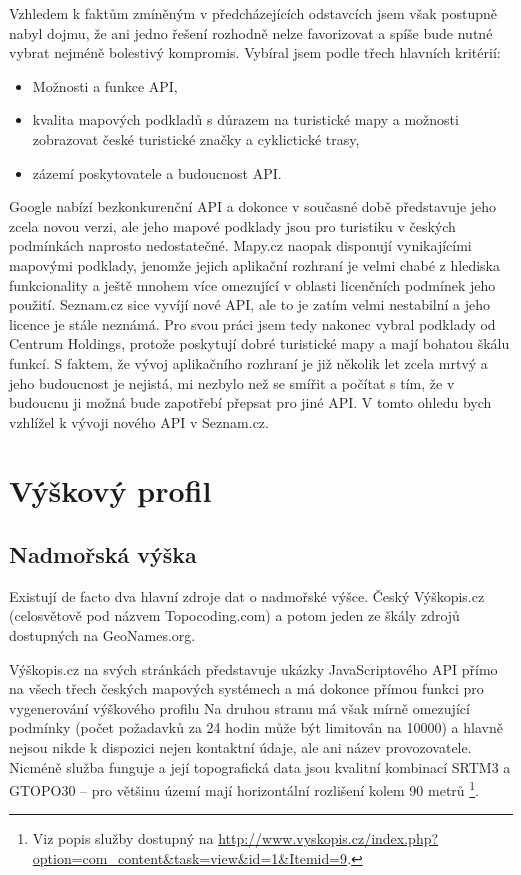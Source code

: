 Vzhledem k faktům zmíněným v předcházejících odstavcích jsem však
postupně nabyl dojmu, že ani jedno řešení rozhodně nelze favorizovat a
spíše bude nutné vybrat nej\-méně bolestivý kompromis. Vybíral jsem
podle třech hlavních kritérií:
\begin{itemize}
	\item Možnosti a funkce API,
	\item kvalita mapových podkladů s důrazem na turistické
	mapy a možnosti zobrazovat české turistické značky a cyklictické
	trasy,
	\item zázemí poskytovatele a budoucnost API.
\end{itemize}

Google nabízí bezkonkurenční API a dokonce v současné době
představuje jeho zcela novou verzi, ale jeho mapové podklady jsou pro turistiku v
českých podmínkách naprosto nedostatečné. Mapy.cz naopak disponují
vynikajícími mapovými podklady, jenomže jejich aplikační rozhraní je
velmi chabé z hlediska funkcionality a ještě mnohem více omezující v
oblasti licenčních podmínek jeho použití. Seznam.cz sice vyvíjí nové
API, ale to je zatím velmi nestabilní a jeho licence je stále
neznámá. Pro svou práci jsem tedy nakonec vybral podklady od Centrum
Holdings, protože poskytují dobré turistické mapy a mají bohatou
škálu funkcí. S faktem, že vývoj aplikačního rozhraní je již několik
let zcela mrtvý a jeho budoucnost je nejistá, mi nezbylo než se
smířit a počítat s tím, že v budoucnu ji možná bude zapotřebí přepsat
pro jiné API. V tomto ohledu bych vzhlížel k vývoji nového API v Seznam.cz.

\section{Výškový profil}\label{vyskovyProfil}
\subsection{Nadmořská výška}\label{vyskopis}
Existují de facto dva hlavní zdroje dat o nadmořské výšce.
Český Výškopis.cz (celosvětově pod názvem Topocoding.com) a potom
jeden ze škály zdrojů dostupných na GeoNames.org.

Výškopis.cz na svých stránkách představuje ukázky JavaScriptového API
přímo na všech třech českých mapových systémech a má dokonce přímou funkci pro
vygenerování výškového profilu Na druhou stranu má však mírně
omezující podmínky (počet požadavků za 24 hodin může být
limitován na 10000) a hlavně nejsou nikde k dispozici nejen kontaktní
údaje, ale ani název provozovatele. Nicméně služba funguje a
její topografická data jsou kvalitní kombinací SRTM3 a GTOPO30 -- pro
většinu území mají horizontální rozlišení kolem 90 metrů
\footnote{Viz popis služby dostupný na
\url{http://www.vyskopis.cz/index.php?option=com_content&task=view&id=1&Itemid=9}.}.

